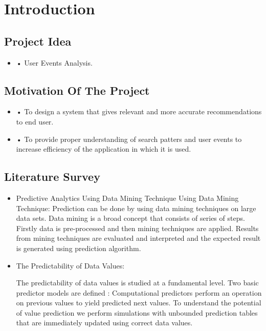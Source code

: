 \documentclass[oneside,a4paper,12pt]{book}
\begin{document}
\begin{enumerate}
\begin{enumerate}
\begin{enumerate}
    \end{enumerate}
    
\end{enumerate}


			
\chapter{Introduction}
\section{Project Idea}
\begin{itemize}
\item •	User Events Analysis.
\end{itemize}


\section{Motivation Of The Project}  
\begin{itemize}
\item •	To design a system that gives relevant and more accurate recommendations to end user.
\item •	To provide proper understanding of search patters and user events to increase efficiency of the application in which it is used.
\end{itemize}

\section{Literature Survey}
\begin{itemize}
\item Predictive Analytics Using Data Mining Technique Using Data Mining Technique:
Prediction can be done by using data mining techniques on large data sets. Data mining is a broad concept that consists of series of steps. Firstly data is pre-processed and then mining techniques are applied. Results from mining techniques are evaluated and interpreted and the expected result is generated using prediction algorithm.

\item The Predictability of Data Values: 

The predictability of data values is studied at a fundamental level. Two basic predictor models are defined : Computational predictors perform an operation on previous values to yield predicted next values. 
To understand the potential of value prediction we perform simulations with unbounded prediction tables that are immediately updated using correct data values.


\end{itemize}
\end{enumerate}
\end{document}
